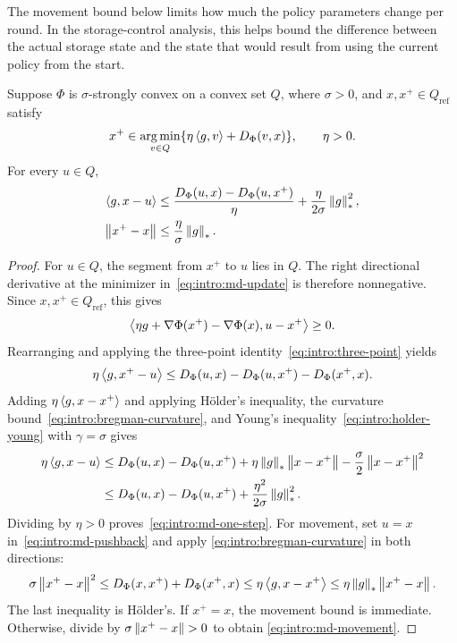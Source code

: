 The movement bound below limits how much the policy parameters change per
round. In the storage-control analysis, this helps bound the difference
between the actual storage state and the state that would result from using
the current policy from the start.

\begin{Thm:Lemma}
\label{lem:intro:mirror-descent}
Suppose $\Phi$ is $\sigma$-strongly convex on a convex set $Q$, where
$\sigma>0$, and $x,x^+\in Q_{\mathrm{ref}}$ satisfy
\begin{equation}\label{eq:intro:md-update}
 x^+\in\operatorname*{arg\,min}_{v\in Q}\{\eta\left\langle g,v \right\rangle+D_\Phi(v,x)\},
 \qquad\eta>0.
\end{equation}
For every $u\in Q$,
\begin{align}
 \left\langle g,x-u \right\rangle
 &\le\frac{D_\Phi(u,x)-D_\Phi(u,x^+)}{\eta}
       +\frac\eta{2\sigma}\left\lVert g \right\rVert_*^2,
       \label{eq:intro:md-one-step}\\
 \left\lVert x^+-x \right\rVert&\le\frac\eta\sigma\left\lVert g \right\rVert_*.
       \label{eq:intro:md-movement}
\end{align}
\end{Thm:Lemma}
\begin{proof}
For $u\in Q$, the segment from $x^+$ to $u$ lies in $Q$.
The right directional derivative at the minimizer in~\eqref{eq:intro:md-update}
is therefore nonnegative. Since $x,x^+\in Q_{\mathrm{ref}}$, this gives
\[
 \left\langle \eta g+\nabla\Phi(x^+)-\nabla\Phi(x),u-x^+ \right\rangle\ge0.
\]
Rearranging and applying the three-point identity~\eqref{eq:intro:three-point}
yields
\begin{equation}\label{eq:intro:md-pushback}
 \eta\left\langle g,x^+-u \right\rangle
 \le D_\Phi(u,x)-D_\Phi(u,x^+)-D_\Phi(x^+,x).
\end{equation}
Adding $\eta\left\langle g,x-x^+ \right\rangle$ and applying H\"older's inequality,
the curvature bound~\eqref{eq:intro:bregman-curvature}, and Young's
inequality~\eqref{eq:intro:holder-young} with $\gamma=\sigma$ gives
\begin{align*}
 \eta\left\langle g,x-u \right\rangle
 &\le D_\Phi(u,x)-D_\Phi(u,x^+)
   +\eta\left\lVert g \right\rVert_*\left\lVert x-x^+ \right\rVert
   -\frac\sigma2\left\lVert x-x^+ \right\rVert^2\\
 &\le D_\Phi(u,x)-D_\Phi(u,x^+)
   +\frac{\eta^2}{2\sigma}\left\lVert g \right\rVert_*^2.
\end{align*}
Dividing by $\eta>0$ proves~\eqref{eq:intro:md-one-step}.
For movement, set $u=x$ in~\eqref{eq:intro:md-pushback} and apply
\eqref{eq:intro:bregman-curvature} in both directions:
\[
  \sigma\left\lVert x^+-x \right\rVert^2
 \le D_\Phi(x,x^+)+D_\Phi(x^+,x)
 \le\eta\left\langle g,x-x^+ \right\rangle
 \le\eta\left\lVert g \right\rVert_*\left\lVert x^+-x \right\rVert.
\]
The last inequality is H\"older's. If $x^+=x$, the movement bound is
immediate. Otherwise, divide by $\sigma\left\lVert x^+-x \right\rVert>0$ to obtain
\eqref{eq:intro:md-movement}.
\end{proof}

